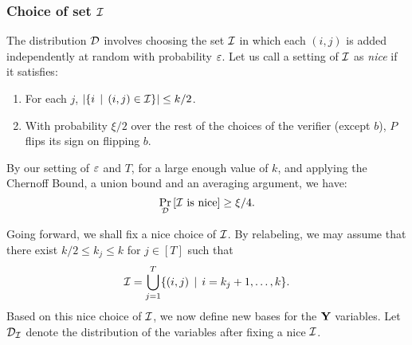 \subsubsection{Choice of set $\mathcal{I}$}
The distribution $\mathcal{D}$ involves choosing the set $\mathcal{I}$ in which
each $(i,j)$ is added independently at random with probability $\varepsilon$.
Let us call a setting of $\mathcal{I}$ as \emph{nice} if it satisfies:
\begin{enumerate}
\item For each $j$, $\left|\{i\,\mid\, (i,j)\in\mathcal{I}\}\right| \leq
k/2$.
\item 
With probability $\xi/2$ over the rest of the choices of the verifier
(except $b$), $P$ flips its sign on flipping $b$. 
\end{enumerate}
By our setting of $\varepsilon$ and $T$, for a large enough value of $k$, and
applying the Chernoff Bound, a union bound and an averaging argument,
we have:
\begin{equation}
\Pr_{\mathcal{D}}\left[\mathcal{I} \textnormal{ is nice}\right] \geq \xi/4.
\label{eqn-nice-I}
\end{equation}

Going forward, we shall fix a nice choice of $\mathcal{I}$. By relabeling, we
may assume that there exist $k/2 \leq k_j \leq k$ for $j \in [T]$ such that
\begin{equation}
\mathcal{I} = \bigcup_{j=1}^T \{(i,j) \,\mid\, i = k_j+1,\dots, k\}.
\end{equation}
Based on this  {nice} choice of $\mathcal{I}$, we now define new bases
for the ${\bf Y}$ variables. Let $\mathcal{D}_{\mathcal{I}}$
denote the distribution of the variables after fixing a nice $\mathcal{I}$.

